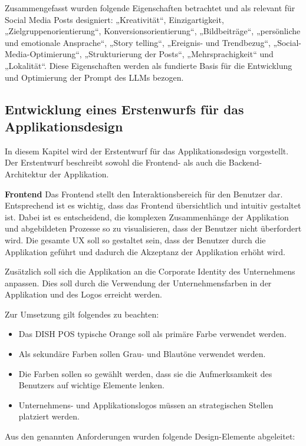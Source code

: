 Zusammengefasst wurden folgende Eigenschaften betrachtet und als relevant für Social Media Posts designiert: „Kreativität“, Einzigartigkeit, „Zielgruppenorientierung“, Konversionsorientierung“, „Bildbeiträge“, „persönliche und emotionale Ansprache“, „Story telling“, „Ereignis- und Trendbezug“, „Social-Media-Optimierung“, „Strukturierung der Posts“, „Mehrsprachigkeit“ und „Lokalität“.
Diese Eigenschaften werden als fundierte Basis für die Entwicklung und Optimierung der Prompt des LLMs bezogen.

\subsection{Entwicklung eines Erstenwurfs für das Applikationsdesign}\label{subsec:entwicklung-eines-erstenwurfs-fuer-das-applikationsdesign}
In diesem Kapitel wird der Erstentwurf für das Applikationsdesign vorgestellt.
Der Erstentwurf beschreibt sowohl die Frontend- als auch die Backend-Architektur der Applikation.

\textbf{Frontend}\newline
Das Frontend stellt den Interaktionsbereich für den Benutzer dar.
Entsprechend ist es wichtig, dass das Frontend übersichtlich und intuitiv gestaltet ist.
Dabei ist es entscheidend, die komplexen Zusammenhänge der Applikation und abgebildeten Prozesse so zu visualisieren, dass der Benutzer nicht überfordert wird.
Die gesamte \ac{UX} soll so gestaltet sein, dass der Benutzer durch die Applikation geführt und dadurch die Akzeptanz der Applikation erhöht wird.

Zusätzlich soll sich die Applikation an die Corporate Identity des Unternehmens anpassen.
Dies soll durch die Verwendung der Unternehmensfarben in der Applikation und des Logos erreicht werden.

Zur Umsetzung gilt folgendes zu beachten:
\begin{itemize}
    \item Das DISH POS typische Orange soll als primäre Farbe verwendet werden.
    \item Als sekundäre Farben sollen Grau- und Blautöne verwendet werden.
    \item Die Farben sollen so gewählt werden, dass sie die Aufmerksamkeit des Benutzers auf wichtige Elemente lenken.
    \item Unternehmens- und Applikationslogos müssen an strategischen Stellen platziert werden.
\end{itemize}
\newpage

Aus den genannten Anforderungen wurden folgende Design-Elemente abgeleitet:

